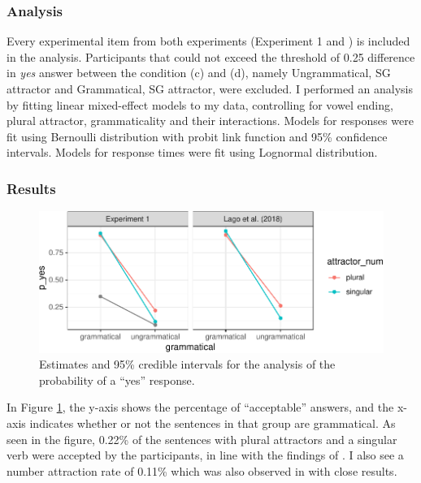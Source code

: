 \documentclass[doc]{apa6}
\begin{document}
\hypertarget{analysis}{%
\subsubsection{Analysis}\label{analysis}}

Every experimental item from both experiments (Experiment 1 and \textcite{Lago2018}) is included in the analysis. Participants that could not exceed the threshold of 0.25 difference in \emph{yes} answer between the condition (c) and (d), namely Ungrammatical, SG attractor and Grammatical, SG attractor, were excluded. I performed an analysis by fitting linear mixed-effect models to my data, controlling for vowel ending, plural attractor, grammaticality and their interactions. Models for responses were fit using Bernoulli distribution with probit link function and 95\% confidence intervals. Models for response times were fit using Lognormal distribution.

\hypertarget{results}{%
\subsubsection{Results}\label{results}}

\begin{figure}
\centering
\includegraphics{AgreementAttraction_files/figure-latex/exp1AvgResponse-1.pdf}
\caption{\label{fig:exp1AvgResponse}Estimates and 95\% credible intervals for the analysis of the probability of a \enquote{yes} response.}
\end{figure}

In Figure \ref{fig:exp1AvgResponse}, the y-axis shows the percentage of \enquote{acceptable} answers, and the x-axis indicates whether or not the sentences in that group are grammatical. As seen in the figure, 0.22\% of the sentences with plural attractors and a singular verb were accepted by the participants, in line with the findings of \textcite{Lago2018}. I also see a number attraction rate of 0.11\% which was also observed in \textcite{Lago2018} with close results.
\end{document}
